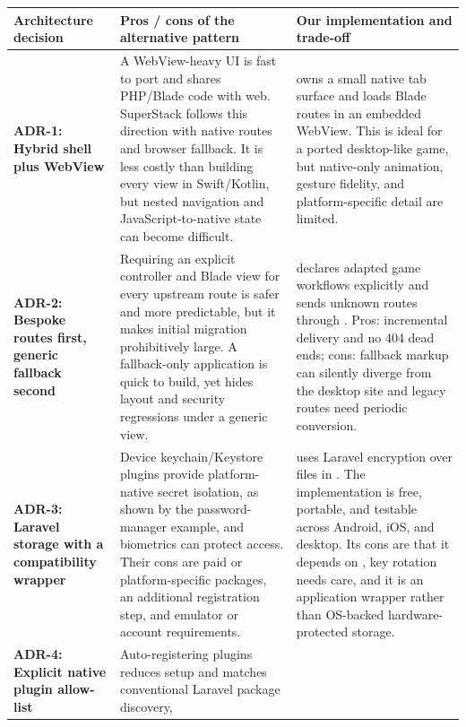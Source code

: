 \begin{table}[!ht]
  \centering
  \scriptsize
  \begin{tabularx}{\textwidth}{|p{}|X|X|}
    \hline
    \textbf{Architecture decision} & \textbf{Pros / cons of the alternative pattern} &
    \textbf{Our implementation and trade-off} \\
    \hline
    \textbf{ADR-1: Hybrid shell plus WebView} &
    A WebView-heavy UI is fast to port and shares PHP/Blade code with web. SuperStack follows this
    direction with native routes and browser fallback. It is less costly than building every view
    in Swift/Kotlin, but nested navigation and JavaScript-to-native state can become difficult. &
    \q{NavigationLayout} owns a small native tab surface and \q{HomeShell} loads Blade routes in
    an embedded WebView. This is ideal for a ported desktop-like game, but native-only animation,
    gesture fidelity, and platform-specific detail are limited. \\
    \hline
    \textbf{ADR-2: Bespoke routes first, generic fallback second} &
    Requiring an explicit controller and Blade view for every upstream route is safer and more
    predictable, but it makes initial migration prohibitively large. A fallback-only application
    is quick to build, yet hides layout and security regressions under a generic view. &
    \q{routes/web.php} declares adapted game workflows explicitly and sends unknown routes through
    \q{GenericController}. Pros: incremental delivery and no 404 dead ends; cons: fallback markup
    can silently diverge from the desktop site and legacy routes need periodic conversion. \\
    \hline
    \textbf{ADR-3: Laravel storage with a compatibility wrapper} &
    Device keychain/Keystore plugins provide platform-native secret isolation, as shown by the
    password-manager example, and biometrics can protect access. Their cons are paid or
    platform-specific packages, an additional registration step, and emulator or account
    requirements. & \q{SecureStorage} uses Laravel encryption over files in \q{storage/}. The
    implementation is free, portable, and testable across Android, iOS, and desktop. Its cons are
    that it depends on \q{APP\_KEY}, key rotation needs care, and it is an application wrapper
    rather than OS-backed hardware-protected storage. \\
    \hline
    \textbf{ADR-4: Explicit native plugin allow-list} &
    Auto-registering plugins reduces setup and matches conventional Laravel package discovery,

\end{tabularx}
\end{table}
